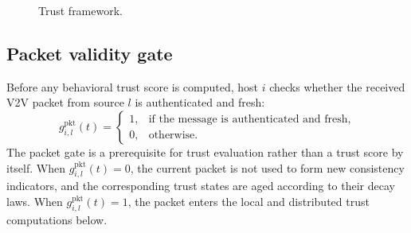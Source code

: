 \documentclass[letterpaper,journal]{IEEEtran}
\def\VT{\mathcal{VT}} %
\begin{document}
\begin{figure}[!ht]
    \caption{Trust framework.}
    \label{fig_trust_framework}
\end{figure}

\subsection{Packet validity gate}\label{subsec_packet_gate}
Before any behavioral trust score is computed, host $i$ checks whether the received V2V packet from source $l$ is authenticated and fresh:
{\small
\begin{equation}
    g_{i,l}^{\mathrm{pkt}}(t)=
    \begin{cases}
        1, & \text{if the message is authenticated and fresh}, \\
        0, & \text{otherwise.}
    \end{cases}
\end{equation}
}
The packet gate is a prerequisite for trust evaluation rather than a trust score by itself. When $g_{i,l}^{\mathrm{pkt}}(t)=0$, the current packet is not used to form new consistency indicators, and the corresponding trust states are aged according to their decay laws. When $g_{i,l}^{\mathrm{pkt}}(t)=1$, the packet enters the local and distributed trust computations below.
\end{document}
